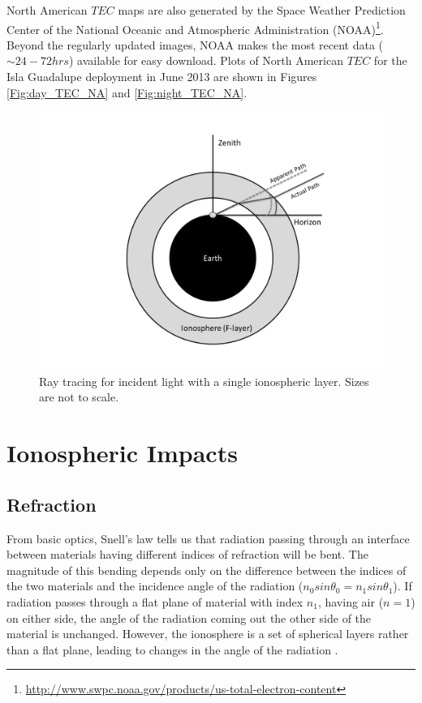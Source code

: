 North American $TEC$ maps are also generated by the Space Weather Prediction Center of the National Oceanic and Atmospheric Administration (NOAA)\footnote{\url{http://www.swpc.noaa.gov/products/us-total-electron-content}}. Beyond the regularly updated images, NOAA makes the most recent data ($\sim 24-72 hrs$) available for easy download. Plots of North American $TEC$ for the Isla Guadalupe deployment in June 2013 are shown in Figures \ref{Fig:day_TEC_NA} and \ref{Fig:night_TEC_NA}. 

\begin{figure}[htb]
\begin{center}
\includegraphics[width=0.95\linewidth]{Ionosphere/figures/refraction.png}
\caption{Ray tracing for incident light with a single ionospheric layer. Sizes are not to scale. }
\label{Fig:iono_refrac}
\end{center}
\end{figure}



\section{Ionospheric Impacts}


\subsection{Refraction}

From basic optics, Snell's law tells us that radiation passing through an interface between materials having different indices of refraction will be bent. The magnitude of this bending depends only on the difference between the indices of the two materials and the incidence angle of the radiation ($n_0 sin \theta_0 = n_1 sin \theta_1$). If radiation passes through a flat plane of material with index $n_1$, having air ($n=1$) on either side, the angle of the radiation coming out the other side of the material is unchanged. However, the ionosphere is a set of spherical layers rather than a flat plane, leading to changes in the angle of the radiation \cite{thompson_2001}. 

